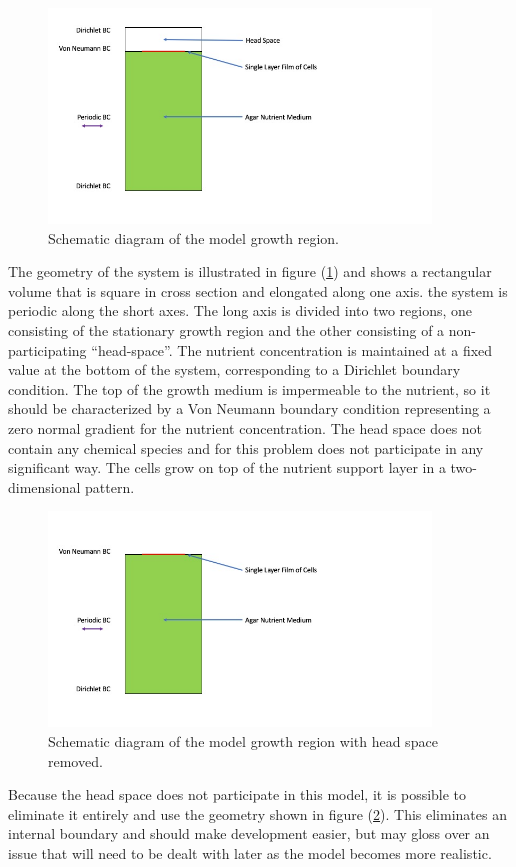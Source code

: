 \documentclass[12pt]{article}
\begin{document}
\begin{figure}
\centering
\includegraphics[width=4.0in,keepaspectratio=true]{FullSys}
\caption{\label{fullsys} Schematic diagram of the model growth region.}
\end{figure}
The geometry of the system is illustrated in figure (\ref{fullsys}) and shows a
rectangular volume that is square in cross section and elongated along one axis.
the system is periodic along the short axes. The long axis is divided into two
regions, one consisting of the stationary growth region and the other consisting
of a non-participating ``head-space''. The nutrient concentration is maintained
at a fixed value at the bottom of the system, corresponding to a Dirichlet
boundary condition. The top of the growth medium is impermeable to the nutrient,
so it should be characterized by a Von Neumann boundary condition representing
a zero normal gradient for the nutrient concentration. The head space does not
contain any chemical species and for this problem does not participate in any
significant way. The cells grow on top of the nutrient support layer in a
two-dimensional pattern.

\begin{figure}
\centering
\includegraphics[width=4.0in,keepaspectratio=true]{ReducedSys}
\caption{\label{reducedsys} Schematic diagram of the model growth region with
head space removed.}
\end{figure}
Because the head space does not participate in this
model, it is possible to eliminate it entirely and use the geometry shown in
figure (\ref{reducedsys}). This eliminates an internal boundary and should make
development easier, but may gloss over an issue that will need to be dealt with
later as the model becomes more realistic.
\end{document}
